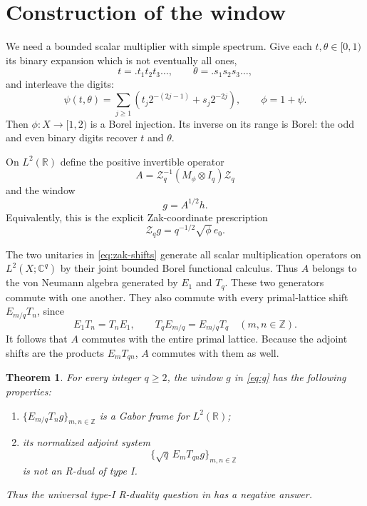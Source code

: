 \documentclass[11pt]{article}
\newtheorem{theorem}{Theorem}
\newcommand{\R}{\mathbb R}
\newcommand{\C}{\mathbb C}
\newcommand{\Z}{\mathbb Z}
\newcommand{\Zak}{\mathcal Z_q}
\begin{document}
\section{Construction of the window}

We need a bounded scalar multiplier with simple spectrum.  Give each
$t,\theta\in[0,1)$ its binary expansion which is not eventually all ones,
\[
 t=.t_1t_2t_3\ldots,\qquad
 \theta=.s_1s_2s_3\ldots,
\]
and interleave the digits:
\begin{equation}\label{eq:phi}
 \psi(t,\theta)
 =\sum_{j\ge1}\left(t_j2^{-(2j-1)}+s_j2^{-2j}\right),
 \qquad \phi=1+\psi.
\end{equation}
Then $\phi:X\to[1,2)$ is a Borel injection.  Its inverse on its range is
Borel: the odd and even binary digits recover $t$ and $\theta$.

On $L^2(\R)$ define the positive invertible operator
\begin{equation}\label{eq:A}
 A=\Zak^{-1}(M_\phi\otimes I_q)\Zak
\end{equation}
and the window
\begin{equation}\label{eq:g}
 g=A^{1/2}h.
\end{equation}
Equivalently, this is the explicit Zak-coordinate prescription
\begin{equation}\label{eq:zg}
 \Zak g=q^{-1/2}\sqrt\phi\,e_0.
\end{equation}

The two unitaries in \eqref{eq:zak-shifts} generate all scalar multiplication
operators on $L^2(X;\C^q)$ by their joint bounded Borel functional calculus.
Thus $A$ belongs to the von Neumann algebra generated by $E_1$ and $T_q$.
These two generators commute with one another.  They also commute with every
primal-lattice shift $E_{m/q}T_n$, since
\[
 E_1T_n=T_nE_1,
 \qquad
 T_qE_{m/q}=E_{m/q}T_q
 \quad(m,n\in\Z).
\]
It follows that $A$ commutes with the entire primal lattice.  Because the
adjoint shifts are the products $E_mT_{qn}$, $A$ commutes with them as well.

\begin{theorem}\label{thm:counterexample}
For every integer $q\ge2$, the window $g$ in \eqref{eq:g} has the following
properties:
\begin{enumerate}[label=\textup{(\roman*)}]
\item $\{E_{m/q}T_ng\}_{m,n\in\Z}$ is a Gabor frame for $L^2(\R)$;
\item its normalized adjoint system
\[
 \{\sqrt q\,E_mT_{qn}g\}_{m,n\in\Z}
\]
is not an R-dual of type I.
\end{enumerate}
Thus the universal type-I R-duality question in \cite{SC} has a negative
answer.
\end{theorem}
\end{document}
